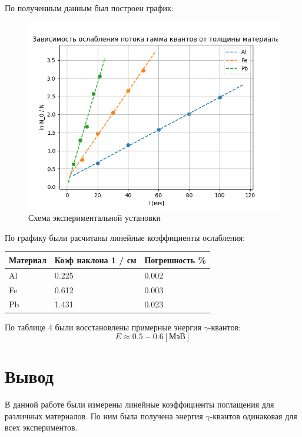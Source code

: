 \documentclass[a4paper,12pt]{article} %
\begin{document}
			По полученным данным был построен график:
			\begin{figure}[h!]
                \centering
                \includegraphics[width=15cm]{img/Graph.png}
                \caption{Схема экспериментальной установки}
                \label{graph1}
            \end{figure}
	\newpage
			По графику были расчитаны линейные коэффициенты ослабления:
			\begin{table}[h!]
				\centering
				\begin{tabular}{|l|l|l|}
				\hline
				Материал & Коэф наклона 1 / см & Погрешность \% \\ \hline
				Al       & 0.225               & 0.002          \\ \hline
				Fe       & 0.612               & 0.003          \\ \hline
				Pb       & 1.431               & 0.023          \\ \hline
				\end{tabular}
			\end{table}\par
			По таблице 4 были восстановлены примерные энергия $\gamma$-квантов:
			\begin{equation}
				E \approx 0.5 - 0.6 [\text{МэВ}]
			\end{equation} 
	
	\section{Вывод}
		
		В данной работе были измерены линейные коэффициенты поглащения для различных материалов.
		По ним была получена энергия $\gamma$-квантов одинаковая для всех экспериментов.
		 
\end{document}
